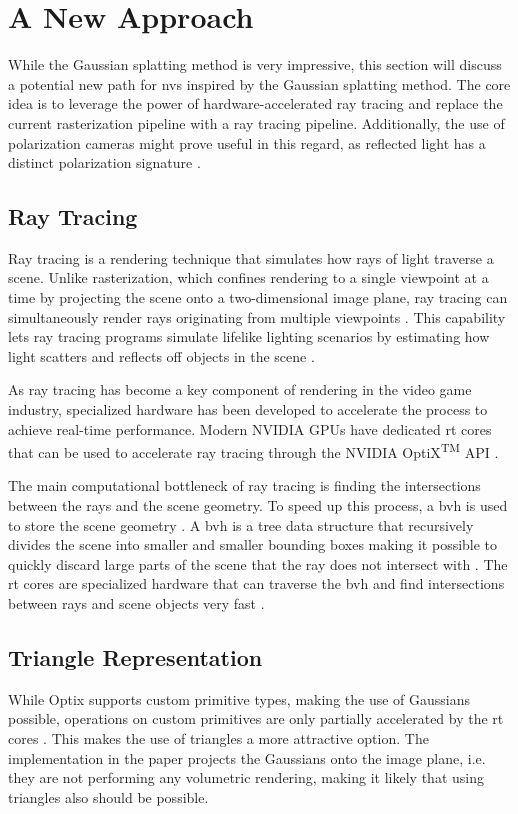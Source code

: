 \section{A New Approach}
While the Gaussian splatting method is very impressive, this section will discuss a potential new path for \gls{nvs} inspired by the Gaussian splatting method.
The core idea is to leverage the power of hardware-accelerated ray tracing and replace the current rasterization pipeline with a ray tracing pipeline.
Additionally, the use of polarization cameras might prove useful in this regard, as reflected light has a distinct polarization signature \cite{lingUniversityPhysicsVolume2016}.

\subsection{Ray Tracing}
Ray tracing is a rendering technique that simulates how rays of light traverse a scene.
Unlike rasterization, which confines rendering to a single viewpoint at a time by projecting the scene onto a two-dimensional image plane, ray tracing can simultaneously render rays originating from multiple viewpoints \cite{caulfieldWhatPathTracing2022}.
This capability lets ray tracing programs simulate lifelike lighting scenarios by estimating how light scatters and reflects off objects in the scene \cite{caulfieldWhatPathTracing2022}.

As ray tracing has become a key component of rendering in the video game industry, specialized hardware has been developed to accelerate the process to achieve real-time performance.
Modern NVIDIA GPUs have dedicated \gls{rt} cores that can be used to accelerate ray tracing through the NVIDIA OptiX\textsuperscript{TM} API \cite{nvidiaNVIDIAOptiXProgramming2023}.

The main computational bottleneck of ray tracing is finding the intersections between the rays and the scene geometry.
To speed up this process, a \gls{bvh} is used to store the scene geometry \cite{nvidiaNVIDIAOptiXProgramming2023}.
A \gls{bvh} is a tree data structure that recursively divides the scene into smaller and smaller bounding boxes making it possible to quickly discard large parts of the scene that the ray does not intersect with \cite{nvidiaNVIDIAOptiXProgramming2023}.
The \gls{rt} cores are specialized hardware that can traverse the \gls{bvh} and find intersections between rays and scene objects very fast \cite{nvidiaNVIDIAOptiXProgramming2023}.


\subsection{Triangle Representation}
While Optix supports custom primitive types, making the use of Gaussians possible, operations on custom primitives are only partially accelerated by the \gls{rt} cores \cite{nvidiaOptiXQuickStart2018}\cite{nvidiaNVIDIAOptiXProgramming2023}.
This makes the use of triangles a more attractive option.
The implementation in the paper projects the Gaussians onto the image plane, i.e. they are not performing any volumetric rendering,
making it likely that using triangles also should be possible.

